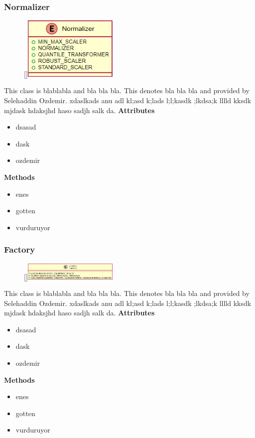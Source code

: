 \subsubsection{Normalizer}
\begin{figure}
    \raisebox{0pt}[\dimexpr{}\baselineskip\relax]{\includegraphics[width=4.5cm]{classes/model-management/7.png}}
\end{figure} 
\par
This class is blablabla and bla bla bla. This denotes bla bla bla and provided by Selehaddin Ozdemir. xdaslkads anu adl kl;asd k;lads l;l;kasdk ;lkdsa;k lllld kksdk mjdask hdaksjhd haso sadjh salk da.
\newline
\newline
\textbf{Attributes}
\begin{itemize}
    \item dsasad
    \item dask
    \item ozdemir
\end{itemize}
\textbf{Methods}
\begin{itemize}
    \item enes
    \item gotten
    \item vurduruyor
\end{itemize}

\subsubsection{Factory}
\begin{figure}
    \raisebox{0pt}[\dimexpr{}\baselineskip\relax]{\includegraphics[width=4.5cm]{classes/model-management/8.png}}
\end{figure} 
\par
This class is blablabla and bla bla bla. This denotes bla bla bla and provided by Selehaddin Ozdemir. xdaslkads anu adl kl;asd k;lads l;l;kasdk ;lkdsa;k lllld kksdk mjdask hdaksjhd haso sadjh salk da.
\newline
\newline
\textbf{Attributes}
\begin{itemize}
    \item dsasad
    \item dask
    \item ozdemir
\end{itemize}
\textbf{Methods}
\begin{itemize}
    \item enes
    \item gotten
    \item vurduruyor
\end{itemize}

